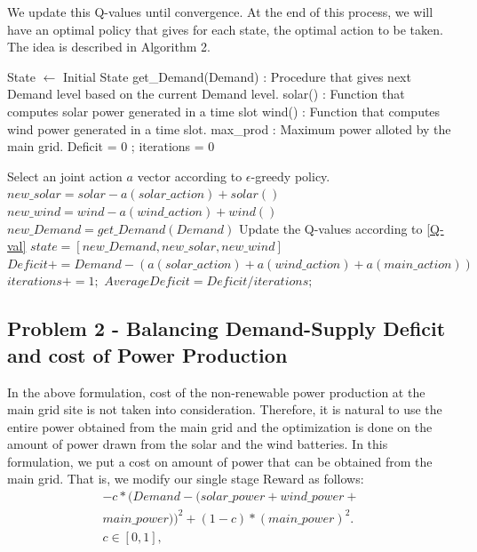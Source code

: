 \documentclass[conference]{IEEEtran}
\begin{document}
We update this Q-values until convergence. At the end of this process, we will have an optimal policy that gives for each state, the optimal action to be taken. The idea is described in  Algorithm 2. 

\begin{algorithm}
\caption{}
\label{q-learning}
\begin{algorithmic}[1]
	\State  State $\leftarrow$ Initial State 
    \State get\_Demand(Demand) : Procedure that gives next Demand level based on the current Demand level.
   \State solar() : Function that computes solar power generated in a time slot
    \State wind() : Function that computes wind power generated in a time slot.
    \State max\_prod : Maximum power alloted by the main grid.
    \State Deficit = 0 ; iterations = 0
     
     \State Select an joint action $a$ vector according to $\epsilon$-greedy policy.
     \State $new\_solar = solar - a(solar\_action) + solar()$
     \State $new\_wind = wind - a(wind\_action) + wind()$
     \State $new\_Demand = get\_Demand(Demand)$
     \State Update the Q-values according to \eqref{Q-val}
     \State $state = [new\_Demand, new\_solar, new\_wind]$
     \State $Deficit += Demand - (a(solar\_action) + a(wind\_action) + a(main\_action))$
     \State $iterations += 1;$
    \EndProcedure
    \State $Average Deficit = Deficit/iterations;$
\end{algorithmic}
\end{algorithm}


\subsection{Problem 2 - Balancing Demand-Supply Deficit and cost of Power Production}
In the above formulation, cost of the non-renewable power production at the main grid site is not taken into consideration. Therefore, it is natural to use the entire power obtained from the main grid and the optimization is done on the amount of power drawn from the solar and the wind batteries. In this formulation, we put a cost on amount of power that can be obtained from the main grid. That is, we modify our single stage Reward as follows:
\begin{equation}\label{prob2}
\begin{split}
 -c*(Demand - (solar\_power + wind\_power+ \\
 main\_power))^2+(1-c)*(main\_power)^2.\\
 c \in[0,1],
 \end{split}
\end{equation}
\end{document}
